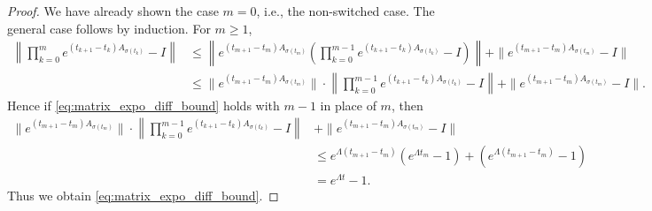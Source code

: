 \documentclass[a4, 11pt]{article}
\begin{document}
\begin{proof}
We have already shown the case $m=0$, i.e., the non-switched case.
The general case follows by induction. For $m \geq 1$,
\begin{align*}
\left\| \prod_{k=0}^{m} 
e^{(t_{k+1} - t_{k})A_{\sigma(t_{k})}}- I 
\right\| 
&\leq
\left\| e^{(t_{m+1} - t_{m})A_{\sigma(t_{m})}} \left(
\prod_{k=0}^{m-1} e^{(t_{k+1} - t_{k})A_{\sigma(t_{k})}}
- I \right) \right\| 
+ 
\| e^{(t_{m+1} - t_{m})A_{\sigma(t_{m})}}- I \| \\
&\leq\| e^{(t_{m+1} - t_{m})A_{\sigma(t_{m})}}\| \cdot
\left\|
\prod_{k=0}^{m-1}
e^{(t_{k+1} - t_{k}) A_{\sigma(t_{k})} } - I
\right\|  
+ 
\| e^{(t_{m+1} - t_{m})A_{\sigma(t_m)}}- I \|.
\end{align*}
Hence if \eqref{eq:matrix_expo_diff_bound} holds with
$m-1$ in place of $m$, then
\begin{align*}
\| e^{(t_{m+1} - t_{m})A_{\sigma(t_{m})}}\| \cdot
\left\|
\prod_{k=0}^{m-1}
e^{(t_{k+1} - t_{k}) A_{\sigma(t_{k})} } - I
\right\| 
&+ 
\| e^{(t_{m+1} - t_{m})A_{\sigma(t_m)}}- I \| \\
&\leq
e^{\Lambda (t_{m+1} - t_{m})}
(e^{\Lambda t_{m}} - 1) + (e^{\Lambda (t_{m+1} - t_{m})} - 1) \\
&= e^{\Lambda t } - 1.
\end{align*}
Thus we obtain \eqref{eq:matrix_expo_diff_bound}.
\end{proof}
\end{document}
